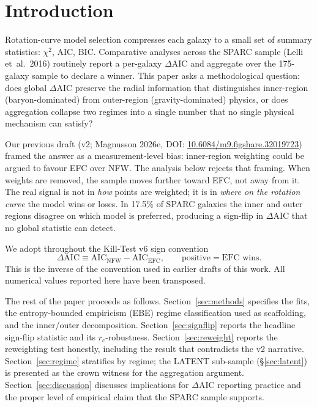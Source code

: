 \documentclass[11pt,a4paper]{article}
\begin{document}
\newpage
\section{Introduction}

Rotation-curve model selection compresses each galaxy to a small set of
summary statistics: $\chi^2$, AIC, BIC.  Comparative analyses across the
SPARC sample (Lelli et~al.\ 2016) routinely report a per-galaxy
$\Delta$AIC and aggregate over the 175-galaxy sample to declare a winner.
This paper asks a methodological question: does global $\Delta$AIC
preserve the radial information that distinguishes inner-region
(baryon-dominated) from outer-region (gravity-dominated) physics, or
does aggregation collapse two regimes into a single number that no
single physical mechanism can satisfy?

Our previous draft (v2; Magnusson 2026e, DOI:
\href{https://doi.org/10.6084/m9.figshare.32019723}{10.6084/m9.figshare.32019723})
framed the answer as a measurement-level bias: inner-region weighting
could be argued to favour EFC over NFW.  The
analysis below rejects that framing.  When weights are removed, the
sample moves further toward EFC, not away from it.  The real signal is
not in {\em how} points are weighted; it is in {\em where on the
rotation curve} the model wins or loses.  In 17.5\% of SPARC galaxies
the inner and outer regions disagree on which model is preferred,
producing a sign-flip in $\Delta$AIC that no global statistic can detect.

We adopt throughout the Kill-Test v6 sign convention
\begin{equation}
  \Delta\text{AIC} \equiv \text{AIC}_{\text{NFW}} - \text{AIC}_{\text{EFC}},
  \qquad \text{positive}=\text{EFC wins.}
  \label{eq:convention}
\end{equation}
This is the inverse of the convention used in earlier drafts of this work.
All numerical values reported here have been transposed.

The rest of the paper proceeds as follows.  Section~\ref{sec:methods}
specifies the fits, the entropy-bounded empiricism (EBE) regime
classification used as scaffolding, and the inner/outer decomposition.
Section~\ref{sec:signflip} reports the headline sign-flip statistic and
its $r_c$-robustness.  Section~\ref{sec:reweight} reports the
reweighting test honestly, including the result that contradicts the v2
narrative.  Section~\ref{sec:regime} stratifies by regime; the LATENT
sub-sample (\S\ref{sec:latent}) is presented as the crown witness for
the aggregation argument.  Section~\ref{sec:discussion} discusses
implications for $\Delta$AIC reporting practice and the proper level of
empirical claim that the SPARC sample supports.
\end{document}
